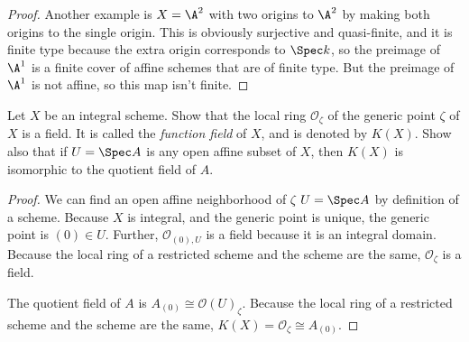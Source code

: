\begin{proof}
	Another example is $X = \A^2 $ with two origins to $\A^2 $ by making both origins to the single origin.
	This is obviously surjective and quasi-finite, and it is finite type because the extra origin corresponds to $\Spec k$, so the preimage of $\A^1 $ is a finite cover of affine schemes that are of finite type.
	But the preimage of $\A^1 $ is not affine, so this map isn't finite.
\end{proof}

\begin{exercise}%
	Let $X $ be an integral scheme. Show that the local ring $\mathcal{O}_{\zeta} $ of the generic point $\zeta  $ of $X $ is a field. It is called the \textit{function field} of $X $, and is denoted by $K(X) $. Show also that if $U = \Spec A $ is any open affine subset of $X $, then $K(X) $ is isomorphic to the quotient field of $A $.
\end{exercise}
\begin{proof}
	We can find an open affine neighborhood of $\zeta  $ $U = \Spec A $ by definition of a scheme.
	Because $X $ is integral, and the generic point is unique, the generic point is $(0) \in U $.
	Further, $\mathcal{O}_{(0),U} $ is a field because it is an integral domain.
	Because the local ring of a restricted scheme and the scheme are the same, $\mathcal{O}_{\zeta } $ is a field.

	The quotient field of $A $ is $A_{(0)} \cong \mathcal{O}(U)_{\zeta} $.
	Because the local ring of a restricted scheme and the scheme are the same, $K(X) = \mathcal{O}_{\zeta }\cong A_{(0)} $.
\end{proof}

